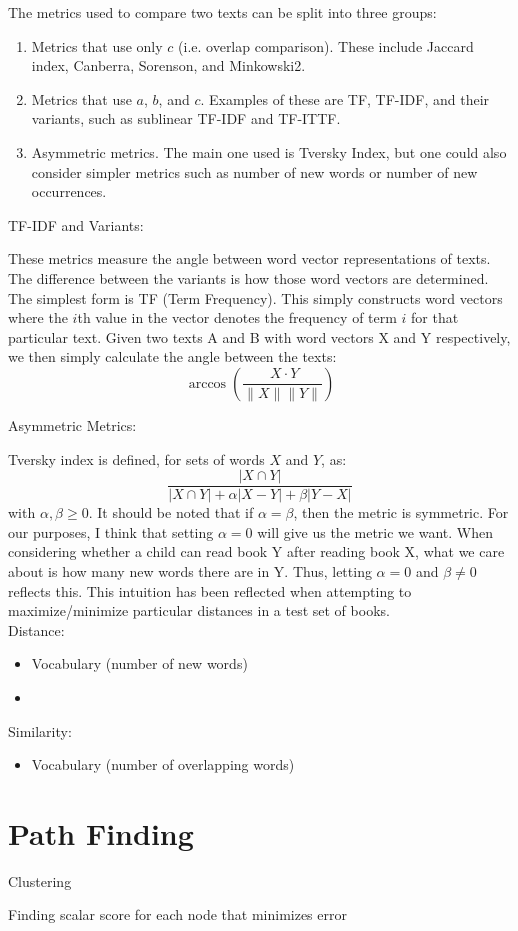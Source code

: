 \documentclass[10pt]{paper}
\begin{document}
The metrics used to compare two texts can be split into three groups:
\begin{enumerate}
	\item Metrics that use only $c$ (i.e. overlap comparison). These include Jaccard index, Canberra, Sorenson, and Minkowski2. 
	\item Metrics that use $a$, $b$, and $c$. Examples of these are TF, TF-IDF, and their variants, such as sublinear TF-IDF and TF-ITTF.
	\item Asymmetric metrics. The main one used is Tversky Index, but one could also consider simpler metrics such as number of new words or number of new occurrences.
\end{enumerate}

TF-IDF and Variants:

These metrics measure the angle between word vector representations of texts. The difference between the variants is how those word vectors are determined. The simplest form is TF (Term Frequency). This simply constructs word vectors where the $i$th value in the vector denotes the frequency of term $i$ for that particular text. Given two texts A and B with word vectors X and Y respectively, we then simply calculate the angle between the texts:
$$\arccos \left( \frac{\ X \cdot Y }{ \lVert X \rVert \lVert Y \rVert} \right)$$

Asymmetric Metrics:

Tversky index is defined, for sets of words $X$ and $Y$, as:
$$\frac{|X \cap Y|}{|X \cap Y| + \alpha |X - Y| + \beta |Y - X|}$$
with $\alpha, \beta \geq 0$. It should be noted that if $\alpha = \beta$, then the metric is symmetric. For our purposes, I think that setting $\alpha = 0$ will give us the metric we want. When considering whether a child can read book Y after reading book X, what we care about is how many new words there are in Y. Thus, letting $\alpha = 0$ and $\beta \neq 0$ reflects this. This intuition has been reflected when attempting to maximize/minimize particular distances in a test set of books.\\

Distance:
\begin{itemize}
  \item Vocabulary (number of new words)
  \item 
\end{itemize}

Similarity:
\begin{itemize}
  \item Vocabulary (number of overlapping words)
\end{itemize}


\section{Path Finding}

Clustering

Finding scalar score for each node that minimizes error
\end{document}
